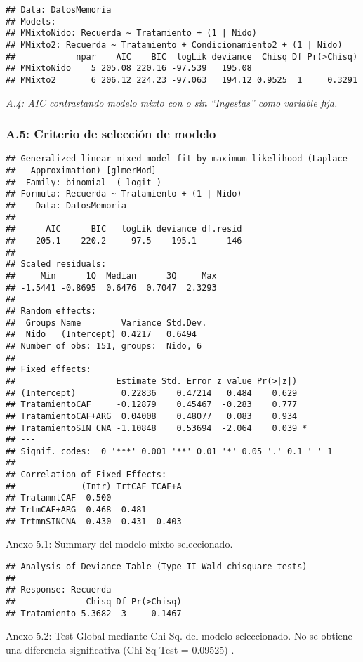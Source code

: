 \documentclass[
  11pt,
]{article}
\begin{document}
\begin{verbatim}
## Data: DatosMemoria
## Models:
## MMixtoNido: Recuerda ~ Tratamiento + (1 | Nido)
## MMixto2: Recuerda ~ Tratamiento + Condicionamiento2 + (1 | Nido)
##            npar    AIC    BIC  logLik deviance  Chisq Df Pr(>Chisq)
## MMixtoNido    5 205.08 220.16 -97.539   195.08                     
## MMixto2       6 206.12 224.23 -97.063   194.12 0.9525  1     0.3291
\end{verbatim}

\emph{A.4: AIC contrastando modelo mixto con o sin ``Ingestas'' como
variable fija.}

\subsubsection{A.5: Criterio de selección de
modelo}\label{a.5-criterio-de-selecciuxf3n-de-modelo}

\begin{verbatim}
## Generalized linear mixed model fit by maximum likelihood (Laplace
##   Approximation) [glmerMod]
##  Family: binomial  ( logit )
## Formula: Recuerda ~ Tratamiento + (1 | Nido)
##    Data: DatosMemoria
## 
##      AIC      BIC   logLik deviance df.resid 
##    205.1    220.2    -97.5    195.1      146 
## 
## Scaled residuals: 
##     Min      1Q  Median      3Q     Max 
## -1.5441 -0.8695  0.6476  0.7047  2.3293 
## 
## Random effects:
##  Groups Name        Variance Std.Dev.
##  Nido   (Intercept) 0.4217   0.6494  
## Number of obs: 151, groups:  Nido, 6
## 
## Fixed effects:
##                    Estimate Std. Error z value Pr(>|z|)  
## (Intercept)         0.22836    0.47214   0.484    0.629  
## TratamientoCAF     -0.12879    0.45467  -0.283    0.777  
## TratamientoCAF+ARG  0.04008    0.48077   0.083    0.934  
## TratamientoSIN CNA -1.10848    0.53694  -2.064    0.039 *
## ---
## Signif. codes:  0 '***' 0.001 '**' 0.01 '*' 0.05 '.' 0.1 ' ' 1
## 
## Correlation of Fixed Effects:
##             (Intr) TrtCAF TCAF+A
## TratamntCAF -0.500              
## TrtmCAF+ARG -0.468  0.481       
## TrtmnSINCNA -0.430  0.431  0.403
\end{verbatim}

Anexo 5.1: Summary del modelo mixto seleccionado.

\begin{verbatim}
## Analysis of Deviance Table (Type II Wald chisquare tests)
## 
## Response: Recuerda
##              Chisq Df Pr(>Chisq)
## Tratamiento 5.3682  3     0.1467
\end{verbatim}

Anexo 5.2: Test Global mediante Chi Sq. del modelo seleccionado. No se
obtiene una diferencia significativa (Chi Sq Test = 0.09525) .
\end{document}
